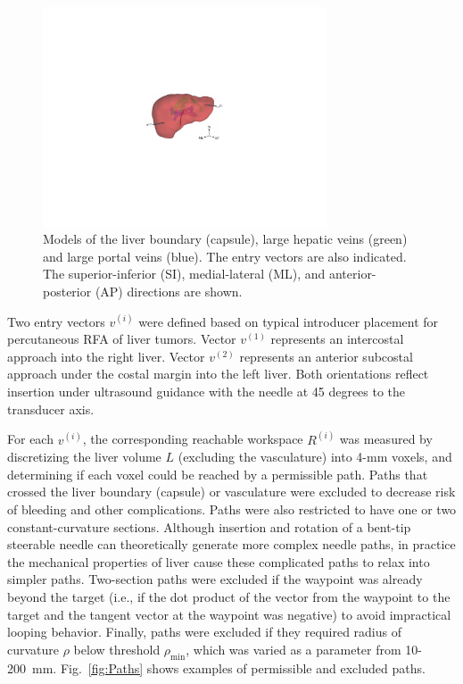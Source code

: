 \begin{figure}[!t]
\centering
\includegraphics[width = 0.75\textwidth]{Images/Chapter3/Meshes3D/Meshes3D}%
\caption[Models of the liver anatomy]{Models of the liver boundary (capsule), large hepatic veins (green) and large portal veins (blue). The entry vectors are also indicated. The superior-inferior (SI), medial-lateral (ML), and anterior-posterior (AP) directions are shown.}
\label{fig:Meshes3D}
\end{figure}

Two entry vectors $v^{(i)}$ were defined based on typical introducer placement for percutaneous RFA of liver tumors. Vector $v^{(1)}$ represents an intercostal approach into the right liver. Vector $v^{(2)}$ represents an anterior subcostal approach under the costal margin into the left liver. Both orientations reflect insertion under ultrasound guidance with the needle at 45 degrees to the transducer axis. 

For each $v^{(i)}$, the corresponding reachable workspace $R^{(i)}$ was measured by discretizing the liver volume $L$ (excluding the vasculature) into 4-mm voxels, and determining if each voxel could be reached by a permissible path. Paths that crossed the liver boundary (capsule) or vasculature were excluded to decrease risk of bleeding and other complications. Paths were also restricted to have one or two constant-curvature sections. Although insertion and rotation of a bent-tip steerable needle can theoretically generate more complex needle paths, in practice the mechanical properties of liver cause these complicated paths to relax into simpler paths. Two-section paths were excluded if the waypoint was already beyond the target (i.e., if the dot product of the vector from the waypoint to the target and the tangent vector at the waypoint was negative) to avoid impractical looping behavior. Finally, paths were excluded if they required radius of curvature $\rho$ below threshold $\rho_{\text{min}}$, which was varied as a parameter from 10-200~mm. Fig.~\ref{fig:Paths} shows examples of permissible and excluded paths. 

